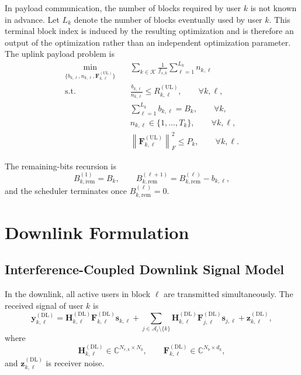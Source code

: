 \documentclass[11pt]{article}
\newcommand{\Kset}{\mathcal{K}}
\newcommand{\Aset}{\mathcal{A}}
\newcommand{\C}{\mathbb{C}}
\newcommand{\Hc}{\mathbf{H}}
\newcommand{\F}{\mathbf{F}}
\newcommand{\norm}[1]{\left\lVert #1 \right\rVert}
\newcommand{\UL}{\mathrm{UL}}
\newcommand{\DL}{\mathrm{DL}}
\begin{document}
In payload communication, the number of blocks required by user $k$ is not
known in advance. Let $L_k$ denote the number of blocks eventually used by user
$k$. This terminal block index is induced by the resulting optimization and is
therefore an output of the optimization rather than an independent optimization
parameter. The uplink payload problem is
\begin{subequations}
\begin{align}
\min_{\{b_{k,\ell},n_{k,\ell},\F_{k,\ell}^{(\UL)}\}}
\quad
&
\sum_{k\in\Kset}\frac{1}{f_{s,k}}\sum_{\ell=1}^{L_k} n_{k,\ell}
\label{eq:ul-payload-obj}
\\
\text{s.t.}\quad
&
\frac{b_{k,\ell}}{n_{k,\ell}}
\le
R_{k,\ell}^{(\UL)},
\qquad \forall k,\ell,
\label{eq:ul-payload-fbl}
\\
&
\sum_{\ell=1}^{L_k} b_{k,\ell} = B_k,
\qquad \forall k,
\label{eq:ul-payload-conservation}
\\
&
n_{k,\ell} \in \{1,\dots,T_k\},
\qquad \forall k,\ell,
\label{eq:ul-payload-n}
\\
&
\norm{\F_{k,\ell}^{(\UL)}}_F^2 \le P_k,
\qquad \forall k,\ell.
\label{eq:ul-payload-power}
\end{align}
\end{subequations}

The remaining-bits recursion is
\begin{equation}
B_{k,\mathrm{rem}}^{(1)}=B_k,
\qquad
B_{k,\mathrm{rem}}^{(\ell+1)}=B_{k,\mathrm{rem}}^{(\ell)}-b_{k,\ell},
\label{eq:ul-remaining-recursion}
\end{equation}
and the scheduler terminates once $B_{k,\mathrm{rem}}^{(\ell)}=0$.

\section{Downlink Formulation}

\subsection{Interference-Coupled Downlink Signal Model}

In the downlink, all active users in block $\ell$ are transmitted
simultaneously. The received signal of user $k$ is
\begin{equation}
\mathbf y_{k,\ell}^{(\DL)}
=
\Hc_{k,\ell}^{(\DL)}\F_{k,\ell}^{(\DL)}\mathbf s_{k,\ell}
+
\sum_{j\in\Aset_\ell\setminus\{k\}}
\Hc_{k,\ell}^{(\DL)}\F_{j,\ell}^{(\DL)}\mathbf s_{j,\ell}
+
\mathbf z_{k,\ell}^{(\DL)},
\label{eq:dl-signal}
\end{equation}
where
\begin{equation}
\Hc_{k,\ell}^{(\DL)} \in \C^{N_{r,k}\times N_b},
\qquad
\F_{k,\ell}^{(\DL)} \in \C^{N_b\times d_k},
\label{eq:dl-dimensions}
\end{equation}
and $\mathbf z_{k,\ell}^{(\DL)}$ is receiver noise.
\end{document}
